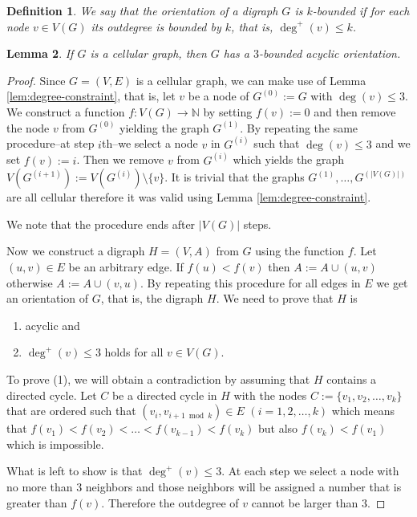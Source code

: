 \documentclass[a4paper, 12pt]{article}
\newtheorem{lem}{Lemma}[section]
\newtheorem{defin}[lem]{Definition}
\begin{document}
\begin{defin}
We say that the orientation of a digraph $G$ is $k$\textit{-bounded} if for each node $v \in V(G)$ its outdegree is bounded by $k$, that is, $\deg^+(v) \leqslant k$.
\end{defin}
\begin{lem}\label{lem:bounded-acyclic-orientation}
If $G$ is a cellular graph, then $G$ has a $3$-bounded acyclic orientation.
\end{lem}
\begin{proof} Since $G=(V,E)$ is a cellular graph, we can make use of Lemma \ref{lem:degree-constraint}, that is, let $v$ be a node of $G^{(0)}:=G$ with $\deg(v) \leqslant 3$. We construct a function $f\colon V(G) \to \mathbb{N}$ by setting $f(v) := 0$ and then remove the node $v$ from $G^{(0)}$ yielding the graph $G^{(1)}$. By repeating the same procedure\---at step $i$th\---we select a node $v$ in $G^{(i)}$ such that $\deg(v) \leqslant 3$ and we set $f(v):=i$. Then we remove $v$ from $G^{(i)}$ which yields the graph $V(G^{(i+1)}) := V(G^{(i)}) \setminus \lbrace v \rbrace$. It is trivial that the graphs $G^{(1)},\ldots,G^{(|V(G)|)}$ are all cellular therefore it was valid using Lemma \ref{lem:degree-constraint}.

We note that the procedure ends after $|V(G)|$ steps.

Now we construct a digraph $H=(V,A)$ from $G$ using the function $f$. Let $(u,v) \in E$ be an arbitrary edge. If $f(u) < f(v)$ then $A:=A\cup (u,v)$ otherwise $A:=A \cup (v,u)$. By repeating this procedure for all edges in $E$ we get an orientation of $G$, that is, the digraph $H$. We need to prove that $H$ is
\begin{enumerate}
\item acyclic and
\item $\deg^+(v) \leqslant 3$ holds for all $v \in V(G)$.
\end{enumerate}
To prove (1), we will obtain a contradiction by assuming that $H$ contains a directed cycle. Let $C$ be a directed cycle in $H$ with the nodes $C:=\lbrace v_1,v_2,\ldots,v_k \rbrace$ that are ordered such that $(v_i,v_{i+1 \bmod{k}}) \in E$ $(i=1,2,\ldots,k)$ which means that $f(v_1) < f(v_2) < \ldots < f(v_{k-1}) < f(v_k)$ but also $f(v_k) < f(v_1)$ which is impossible.

What is left to show is that $\deg^+(v) \leqslant 3$. At each step we select a node with no more than $3$ neighbors and those neighbors will be assigned a number that is greater than $f(v)$. Therefore the outdegree of $v$ cannot be larger than $3$.
\end{proof}
\end{document}
